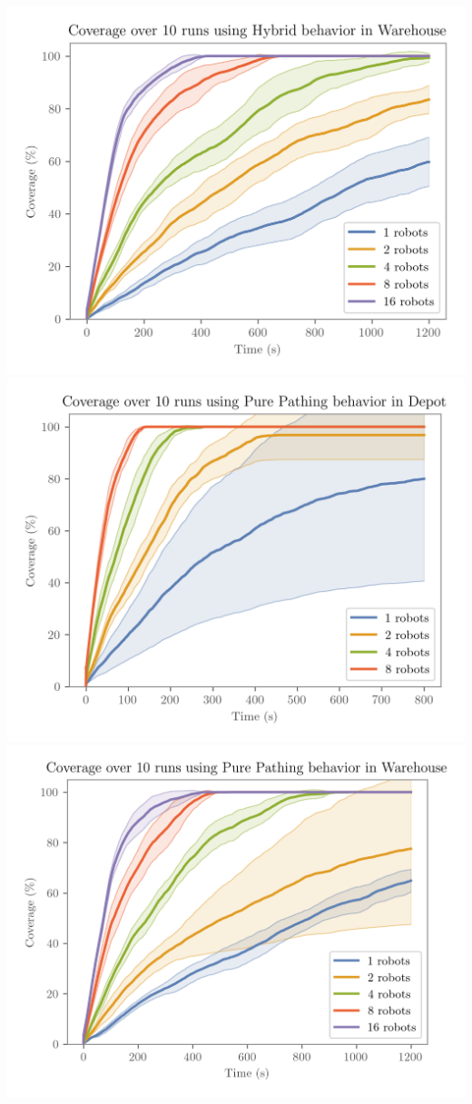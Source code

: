 \hfill
\includegraphics[width=\w]{figures/plots/benchmarks/coverage-over-10-runs-using-hybrid-behavior-in-warehouse.png}
\\
\includegraphics[width=\w]{figures/plots/benchmarks/coverage-over-10-runs-using-pure-pathing-behavior-in-depot.png}
\hfill
\includegraphics[width=\w]{figures/plots/benchmarks/coverage-over-10-runs-using-pure-pathing-behavior-in-warehouse.png}
